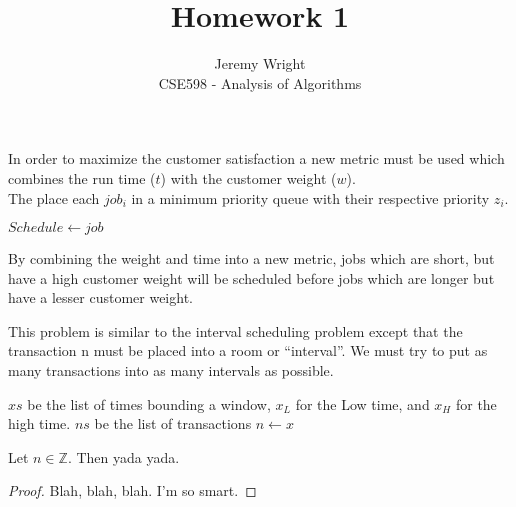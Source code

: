 \documentclass[12pt]{article}
\newcommand{\Z}{\mathbb{Z}}
\newenvironment{problem}[2][Problem]{\begin{trivlist}
\item[\hskip \labelsep {\bfseries #1}\hskip \labelsep {\bfseries #2.}]}{\end{trivlist}}
\begin{document}
 
 
\title{Homework 1}%
\author{Jeremy Wright\\ %
CSE598 - Analysis of Algorithms} %
 
\maketitle
 
\begin{problem}{4.13} 
In order to maximize the customer satisfaction a new metric must be used which
combines the run time ($t$) with the customer weight ($w$).
\begin{equation}
\end{equation}
The place each $job_i$ in a minimum priority queue with their respective priority
$z_i$.
\begin{algorithmic}
        \State $Schedule \gets job$
    \EndFor
\end{algorithmic}

By combining the weight and time into a new metric, jobs which are short, but
have a high customer weight will be scheduled before jobs which are longer but
have a lesser customer weight.
\end{problem}
 
\begin{problem}{4.16}
    This problem is similar to the interval scheduling problem except that the
    transaction n must be placed into a room or ``interval''. We must try to put
    as many transactions into as many intervals as possible.
    \begin{algorithmic}
        \Require $xs$ be the list of times bounding a window, $x_L$ for the Low time, and
        $x_H$ for the high time. 
        \Require $ns$ be the list of transactions 
                    \State $n \gets x$ 
                \EndIf
            \EndFor
        \EndFor
\end{algorithmic}
Let $n\in \Z$.  Then yada yada.
\end{problem}
 
\begin{proof}
Blah, blah, blah.  I'm so smart.
\end{proof}
 
 
\end{document}
